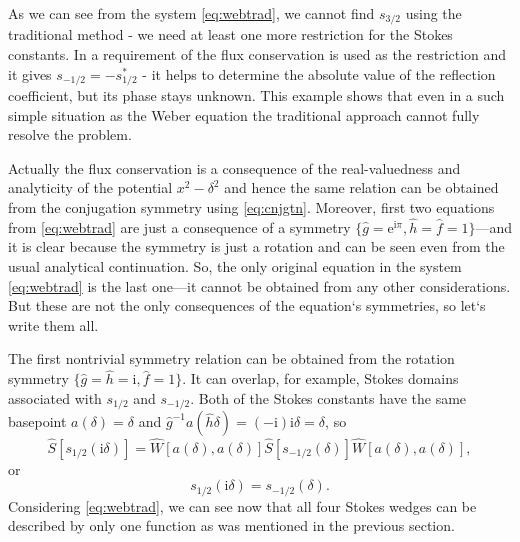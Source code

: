 \documentclass[atmp]{ipart_v1}
\def\rme{\mathrm{e}}
\def\rmi{\mathrm{i}}
\def\S{\widehat{S}}
\def\W{\widehat{W}}
\def\f{\hat{f}}
\def\g{\hat{g}}
\def\h{\hat{h}}
\def\unity{1}
\newcommand\eref[1]{\eqref{#1}}
\begin{document}
As we can see from the system \eref{eq:webtrad}, we cannot find $s_{3/2}$ using the traditional method - 
we need at least one more restriction for the Stokes constants. In \cite{white} a 
requirement of the flux conservation is used as the restriction 
and it gives $s_{-1/2}=-s_{1/2}^*$ - it helps to determine the absolute value of the
reflection coefficient, but its phase stays unknown. This example shows that even in 
a such simple situation as the Weber equation the traditional approach cannot fully 
resolve the problem.
 
Actually the flux conservation is a consequence of the real-valuedness and analyticity 
of the potential $x^2-\delta^2$ and hence the same relation can be obtained from the 
conjugation symmetry using \eref{eq:cnjgtn}. Moreover, first two equations from \eref{eq:webtrad} 
are just a consequence of a symmetry $\{\g=\rme^{\rmi\pi},\h=\f=\unity\}$---and it is clear 
because the symmetry is just a rotation and can be seen even from the usual analytical continuation. 
So, the only original equation in the system \eref{eq:webtrad} is the last one---it cannot 
be obtained from any other considerations. But these are not the only consequences of the 
equation`s symmetries, so let`s write them all.

The first nontrivial symmetry relation can be obtained from the rotation symmetry 
$\{\g=\h=\rmi,\f=\unity\}$. It can overlap, for example, Stokes domains associated with
$s_{1/2}$ and $s_{-1/2}$. Both of the Stokes constants have the same 
basepoint $a(\delta)=\delta$ and $\g^{-1}a(\h\delta)=(-\rmi)\rmi\delta=\delta$, so
\begin{equation}
\S \left[ s_{1/2}(\rmi \delta) \right] = 
\W \left[ a(\delta), a(\delta) \right]
\S \left[ s_{-1/2}(\delta) \right]
\W \left[ a(\delta), a(\delta) \right],
\end{equation}
or
\begin{equation}
s_{1/2}(\rmi \delta) = s_{-1/2}(\delta).
\label{eq:websym_1}
\end{equation}
Considering \eref{eq:webtrad}, we can 
see now that all four Stokes wedges can be described by only one function as 
was mentioned in the previous section. 
\end{document}

